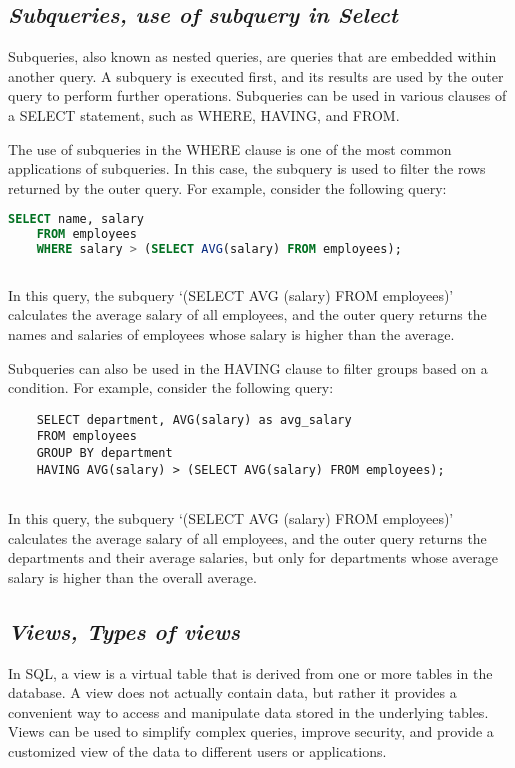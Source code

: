 \documentclass{article}
\begin{document}
\subsection{\textit{Subqueries, use of subquery in Select}}
Subqueries, also known as nested queries, are queries that are embedded within another query. A subquery is executed first, and its results are used by the outer query to perform further operations. Subqueries can be used in various clauses of a SELECT statement, such as WHERE, HAVING, and FROM.

The use of subqueries in the WHERE clause is one of the most common applications of subqueries. In this case, the subquery is used to filter the rows returned by the outer query. For example, consider the following query:
\begin{lstlisting}[language=SQL]
    SELECT name, salary
    FROM employees
    WHERE salary > (SELECT AVG(salary) FROM employees);
        
\end{lstlisting}
In this query, the subquery `(SELECT AVG (salary) FROM employees)' calculates the average salary of all employees, and the outer query returns the names and salaries of employees whose salary is higher than the average.

Subqueries can also be used in the HAVING clause to filter groups based on a condition. For example, consider the following query:
\begin{lstlisting}
    SELECT department, AVG(salary) as avg_salary
    FROM employees
    GROUP BY department
    HAVING AVG(salary) > (SELECT AVG(salary) FROM employees);
    
\end{lstlisting}
In this query, the subquery `(SELECT AVG (salary) FROM employees)' calculates the average salary of all employees, and the outer query returns the departments and their average salaries, but only for departments whose average salary is higher than the overall average.
\subsection{\textit{Views, Types of views}}
In SQL, a view is a virtual table that is derived from one or more tables in the database. A view does not actually contain data, but rather it provides a convenient way to access and manipulate data stored in the underlying tables. Views can be used to simplify complex queries, improve security, and provide a customized view of the data to different users or applications.\\
\end{document}
